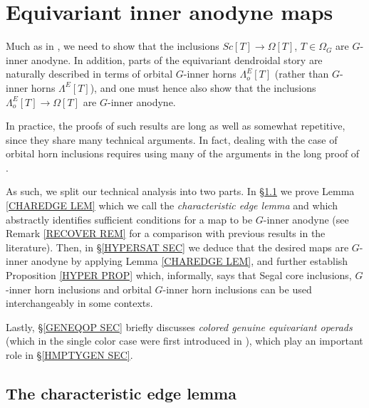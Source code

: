 \documentclass[a4paper,10pt
,draft
]{article}%
\begin{document}
\section{Equivariant inner anodyne maps}\label{EQINNERAN SEC}

Much as in \cite[\S 2]{CM13a}, 
we need to show that the inclusions $Sc[T] \to \Omega[T]$, $T\in \Omega_G$ are $G$-inner anodyne.
In addition, parts of the equivariant dendroidal story are 
naturally described in terms of 
orbital $G$-inner horns $\Lambda^E_o[T]$ 
(rather than $G$-inner horns $\Lambda^E[T]$),
and one must hence also show that the inclusions
$\Lambda^E_o[T] \to \Omega[T]$
are $G$-inner anodyne.

In practice, the proofs of such results are long as well as somewhat repetitive, since they share many technical arguments.
In fact, dealing with the case of orbital horn inclusions requires using many of the arguments in the long proof of \cite[Thm 7.1]{Per18}.

As such, we split our technical analysis into two parts.
In \S \ref{CHAREDGE SEC} we prove Lemma \ref{CHAREDGE LEM} which  we call the \textit{characteristic edge lemma} and
which abstractly identifies sufficient conditions for a map to be $G$-inner anodyne
(see Remark \ref{RECOVER REM} for a comparison with previous results in the literature).
Then, in \S \ref{HYPERSAT SEC} we deduce that the desired maps
are $G$-inner anodyne by applying Lemma \ref{CHAREDGE LEM},
and further establish Proposition \ref{HYPER PROP} which,
informally,
says that Segal core inclusions, $G$-inner horn inclusions and orbital $G$-inner horn inclusions can be used interchangeably in some contexts.


Lastly, \S \ref{GENEQOP SEC} briefly discusses \textit{colored genuine equivariant operads}
(which in the single color case were first introduced in \cite{BP17}), which play an important role in \S \ref{HMPTYGEN SEC}.


\subsection{The characteristic edge lemma} \label{CHAREDGE SEC}
\end{document}
